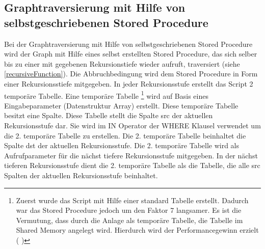\subsection{Graphtraversierung mit Hilfe von selbstgeschriebenen Stored Procedure}
Bei der Graphtraversierung mit Hilfe von selbstgeschriebenen Stored Procedure wird der Graph mit Hilfe eines selbst erstellten Stored Procedure, das sich selber bis
zu einer mit gegebenen Rekursionstiefe wieder aufruft, traversiert (siehe \ref{recursiveFunction}). Die Abbruchbedingung wird dem Stored Procedure in Form einer
Rekursionsstiefe mitgegeben. In jeder Rekursionsstufe erstellt das Script 2 temporäre Tabelle. Eine temporäre Tabelle \footnote{Zuerst wurde das Script mit Hilfe einer standard Tabelle
erstellt. Dadurch war das Stored Procedure jedoch um den Faktor 7 langsamer. Es ist die Vermutung, dass durch die Anlage als temporäre Tabelle, die Tabelle im Shared Memory angelegt wird.
Hierdurch wird der Performancegewinn erzielt ( \cite[S.26]{froehlich01})}
wird auf Basis eines Eingabeparameter (Datenstruktur Array) erstellt.
Diese temporäre Tabelle besitzt eine Spalte. Diese Tabelle stellt die Spalte src der aktuellen Rekursionsstufe dar. Sie wird im IN Operator der WHERE Klausel verwendet
um die 2. temporäre Tabelle zu erstellen. Die 2. temporäre Tabelle beinhaltet die Spalte dst der aktuellen Rekursionsstufe. Die 2. temporäre Tabelle wird als
Aufrufparameter für die nächst tiefere Rekursionsstufe mitgegeben. In der nächst tieferen Rekursionsstufe dient die 2. temporäre Tabelle als die Tabelle, die alle
src Spalten der aktuellen Rekursionsstufe beinhaltet.

